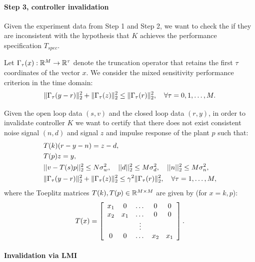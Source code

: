 \documentclass[11pt, onecolumn]{article}
\begin{document}
\paragraph{Step 3, controller invalidation}
Given the experiment data from Step 1 and Step 2, we want to check the if they are inconsistent with
the hypothesis that $K$ achieves the performance specification $T_{spec}$.

Let $\Gamma_{\tau}(x):\mathbb R^{M}\to \mathbb R^{\tau}$ denote the truncation operator that retains the first $\tau$
coordinates of the vector $x$. We consider the mixed sensitivity performance criterion in the time
domain:
\begin{align*}
  \|\Gamma_{\tau}(y-r)\|_2^2 + \|\Gamma_{\tau}(z)\|_2^2 \le \|\Gamma_{\tau}(r)\|_2^2, \quad \forall \tau = 0,1,\dots, M.
\end{align*}

Given the open loop data $(s,v)$ and the closed loop data $(r,y)$, in order to  invalidate controller
$K$ we want to certify that there does not exist consistent noise signal $(n,d)$ and signal $z$ and
impulse response of the plant $p$ such that:
\begin{align}
  & T(k) (r-y - n) = z-d,
  \label{eq:linear-k}
  \\
  & T(p) z = y,
  \label{eq:quad-p}
  \\
  & ||v - T(s)p||_2^2 \le N \sigma_w^2, \quad ||d||_2^2\leq M \sigma_d^2 , \quad ||n||_2^2\leq M
  \sigma_n^2,
  \label{eq:noise-bound}
  \\
  & \|\Gamma_{\tau}(y-r)\|_2^2 + \|\Gamma_{\tau}(z)\|_2^2 \le \gamma^2 \|\Gamma_{\tau}(r)\|_2^2, \quad \forall
  \tau = 1,\dots, M,
  \label{eq:perf-spec}
\end{align}
where the Toeplitz matrices $T(k), T(p)\in\mathbb R^{M\times M}$  are given by (for $x=k,p$):
\begin{align}
  \label{eq:Tk-Tp}
  T(x) = \left[
    \begin{array}[c]{ccccc}
      x_1 & 0 &\dots & 0  & 0
      \\
      x_2 & x_1 & \dots  & 0  & 0
      \\
      & & \vdots & &
      \\
      0  & 0  & \dots & x_2 & x_1
    \end{array}
\right].
\end{align}


\paragraph{Invalidation via LMI}
\end{document}
